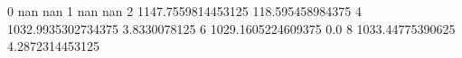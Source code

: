 0 nan nan
1 nan nan
2 1147.7559814453125 118.595458984375
4 1032.9935302734375 3.8330078125
6 1029.1605224609375 0.0
8 1033.44775390625 4.2872314453125
